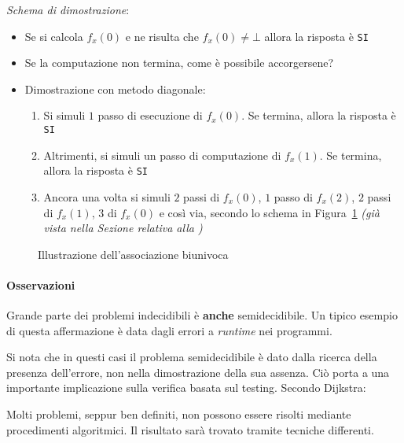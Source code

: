 \documentclass[italian, 10pt]{article}
\begin{document}
\textit{Schema di dimostrazione}:
\begin{itemize}
  \item Se si calcola \(f_x(0)\) e ne risulta che \(f_x(0) \neq \bot\) allora la risposta è \texttt{SI}
  \item Se la computazione non termina, come è possibile accorgersene?
  \item Dimostrazione con metodo diagonale:
        \begin{enumerate}
          \item Si simuli \(1\) passo di esecuzione di \(f_x(0)\). Se termina, allora la risposta è \texttt{SI}
          \item Altrimenti, si simuli un passo di computazione di \(f_x(1)\). Se termina, allora la risposta è \texttt{SI}
          \item Ancora una volta si simuli \(2\) passi di \(f_x(0)\), \(1\) passo di \(f_x(2)\), \(2\) passi di \(f_x(1)\), \(3\) di \(f_x(0)\) e così via, secondo lo schema in Figura~\ref{fig:associazione-biunivoca-2} \textit{(già vista nella Sezione relativa alla )}
        \end{enumerate}
\end{itemize}

\begin{figure}[htbp]
  \bigskip
  \centering
  \caption{Illustrazione dell'associazione biunivoca}
  \label{fig:associazione-biunivoca-2}
  \bigskip
\end{figure}

\paragraph{Osservazioni}

Grande parte dei problemi indecidibili è \textbf{anche} semidecidibile.
Un tipico esempio di questa affermazione è data dagli errori a \textit{runtime} nei programmi.

Si nota che in questi casi il problema semidecidibile è dato dalla ricerca della presenza dell'errore, non nella dimostrazione della sua assenza.
Ciò porta a una importante implicazione sulla verifica basata sul testing.
Secondo Dijkstra:


Molti problemi, seppur ben definiti, non possono essere risolti mediante procedimenti algoritmici.
Il risultato sarà trovato tramite tecniche differenti.
\end{document}
